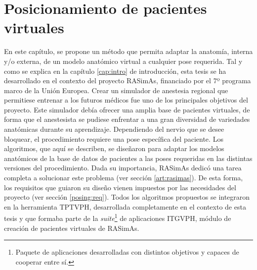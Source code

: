 \chapter{Posicionamiento de pacientes virtuales} 
\label{cap:posing}

En este capítulo, se propone un método que permita adaptar la anatomía, interna y/o externa, de un modelo anatómico virtual a cualquier pose requerida. Tal y como se explica en la capítulo \ref{cap:intro} de introducción, esta tesis se ha desarrollado en el contexto del proyecto \ac{RASimAs}, financiado por el 7º programa marco de la Unión Europea. Crear un simulador de anestesia regional que permitiese entrenar a los futuros médicos fue uno de los principales objetivos del proyecto. 
Este simulador debía ofrecer una amplia base de pacientes virtuales, de forma que el anestesista se pudiese enfrentar a una gran diversidad de variedades anatómicas durante su aprendizaje. Dependiendo del nervio que se desee bloquear, el procedimiento requiere una pose específica del paciente. Los algoritmos, que aquí se describen, se diseñaron para adaptar los modelos anatómicos de la base de datos de pacientes a las poses requeridas en las distintas versiones del procedimiento. Dada su importancia, \ac{RASimAs} dedicó una tarea completa a solucionar este problema (ver sección \ref{art:rasimas}). 
De esta forma, los requisitos que guiaron su diseño vienen impuestos por las necesidades del proyecto (ver sección \ref{posing:req}). Todos los algoritmos propuestos se integraron en la herramienta \ac{TPTVPH}, desarrollada completamente en el contexto de esta tesis y que formaba parte de la \emph{suite}\footnote{Paquete de aplicaciones desarrolladas con distintos objetivos y capaces de cooperar entre sí.} de aplicaciones \ac{ITGVPH}, módulo de creación de pacientes virtuales de  \ac{RASimAs}.



